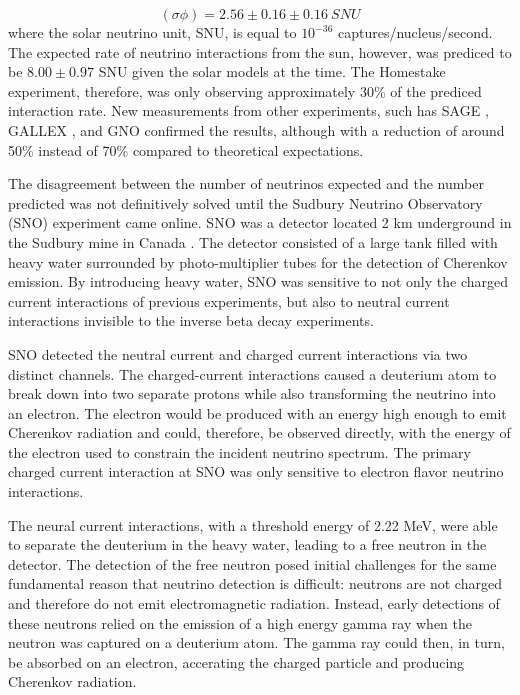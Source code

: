 \begin{equation}
\left(\sigma \phi\right) = 2.56 \pm 0.16 \pm 0.16 \ SNU
\end{equation}
%
where the solar neutrino unit, SNU, is equal to  $10^{-36}$ captures/nucleus/second. 
The expected rate of neutrino interactions from the sun, however, was prediced to be $8.00 \pm 0.97$ SNU given the solar models at the time.
The Homestake experiment, therefore, was only observing approximately 30\% of the prediced interaction rate.
New measurements from other experiments, such has SAGE \cite{Description-SAGE}, GALLEX \cite{Description-GALLEX}, and GNO \cite{Description-GNO} confirmed the results, although with a reduction of around 50\% instead of 70\% compared to theoretical expectations.

The disagreement between the number of neutrinos expected and the number predicted was not definitively solved until the Sudbury Neutrino Observatory (SNO) experiment came online.
SNO was a detector located 2 km underground in the Sudbury mine in Canada \cite{Description-SNO}.
The detector consisted of a large tank filled with heavy water surrounded by photo-multiplier tubes for the detection of Cherenkov emission.
By introducing heavy water, SNO was sensitive to not only the charged current interactions of previous experiments, but also to neutral current interactions invisible to the inverse beta decay experiments.

SNO detected the neutral current and charged current interactions via two distinct channels. 
The charged-current interactions caused a deuterium atom to break down into two separate protons while also transforming the neutrino into an electron.
The electron would be produced with an energy high enough to emit Cherenkov radiation and could, therefore, be observed directly, with the energy of the electron used to constrain the incident neutrino spectrum.
The primary charged current interaction at SNO was only sensitive to electron flavor neutrino interactions.

The neural current interactions, with a threshold energy of 2.22 MeV, were able to separate the deuterium in the heavy water, leading to a free neutron in the detector. 
The detection of the free neutron posed initial challenges for the same fundamental reason that neutrino detection is difficult: neutrons are not charged and therefore do not emit electromagnetic radiation.
Instead, early detections of these neutrons relied on the emission of a high energy gamma ray when the neutron was captured on a deuterium atom.
The gamma ray could then, in turn, be absorbed on an electron, accerating the charged particle and producing Cherenkov radiation.


